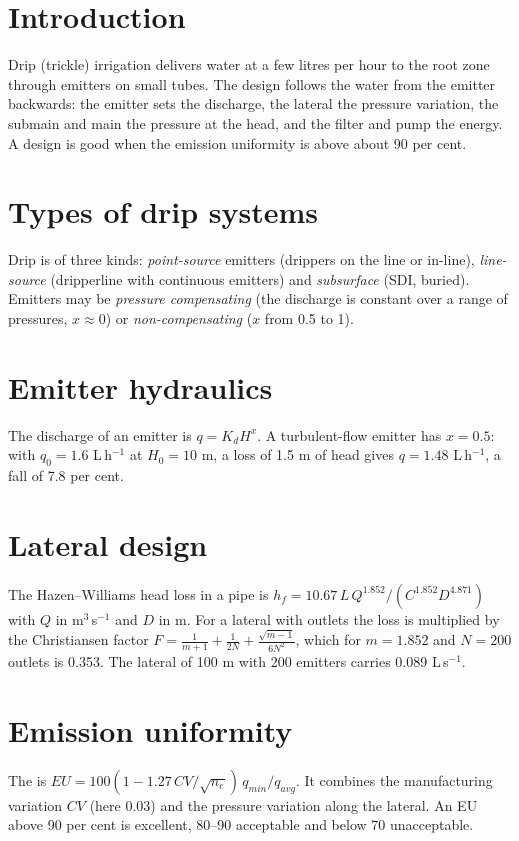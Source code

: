 \section{Introduction}
Drip (trickle) irrigation delivers water at a few litres per hour to the root zone through emitters on small tubes. The design follows the water from the emitter backwards: the emitter sets the discharge, the lateral the pressure variation, the submain and main the pressure at the head, and the filter and pump the energy. A design is good when the emission uniformity is above about 90 per cent.

\section{Types of drip systems}
Drip is of three kinds: \emph{point-source} emitters (drippers on the line or in-line), \emph{line-source} (dripperline with continuous emitters) and \emph{subsurface} (SDI, buried). Emitters may be \emph{pressure compensating} (the discharge is constant over a range of pressures, $x\approx0$) or \emph{non-compensating} ($x$ from 0.5 to 1).

\section{Emitter hydraulics}
The discharge of an emitter is $q=K_dH^{x}$. A turbulent-flow emitter has $x=0.5$: with $q_0=1.6$ L\,h$^{-1}$ at $H_0=10$ m, a loss of 1.5 m of head gives $q=1.48$ L\,h$^{-1}$, a fall of 7.8 per cent.

\section{Lateral design}
The Hazen--Williams head loss in a pipe is $h_f=10.67\,L\,Q^{1.852}/(C^{1.852}D^{4.871})$ with $Q$ in m$^3$\,s$^{-1}$ and $D$ in m. For a lateral with outlets the loss is multiplied by the Christiansen factor $F=\frac{1}{m+1}+\frac{1}{2N}+\frac{\sqrt{m-1}}{6N^2}$, which for $m=1.852$ and $N=200$ outlets is 0.353. The lateral of 100 m with 200 emitters carries 0.089 L\,s$^{-1}$.

\section{Emission uniformity}
The  is $EU=100(1-1.27\,CV/\sqrt{n_e})\,q_{min}/q_{avg}$. It combines the manufacturing variation $CV$ (here 0.03) and the pressure variation along the lateral. An EU above 90 per cent is excellent, 80--90 acceptable and below 70 unacceptable.


